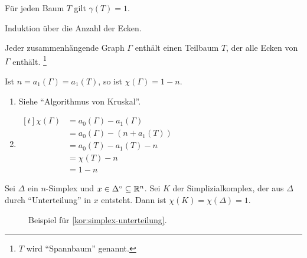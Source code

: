 \begin{bemerkung}
    Für jeden Baum $T$ gilt $\gamma(T) = 1$.
\end{bemerkung}

\begin{beweis}
    Induktion über die Anzahl der Ecken.
\end{beweis}

\begin{bemerkung}
    \begin{bemenum}
        \item Jeder zusammenhängende Graph $\Gamma$ enthält einen
              Teilbaum $T$, der alle Ecken von $\Gamma$ enthält.%
              \footnote{$T$ wird \enquote{Spannbaum} genannt.}
        \item Ist $n = a_1(\Gamma) = a_1(T)$, so ist $\chi(\Gamma) = 1 - n$.
    \end{bemenum}
\end{bemerkung}

\begin{beweis}\leavevmode
    \begin{enumerate}[label=\alph*),ref=\thedefinition.\alph*]
        \item Siehe \enquote{Algorithmus von Kruskal}.
        \item $\begin{aligned}[t]\chi(\Gamma) &= a_0(\Gamma) - a_1(\Gamma)\\
                                        &= a_0(\Gamma) - (n+a_1(T))\\
                                        &= a_0(T) - a_1(T) - n\\
                                        &= \chi(T) - n\\
                                        &= 1-n
              \end{aligned}$
    \end{enumerate}
\end{beweis}

\begin{bemerkung}\label{kor:simplex-unterteilung}
    Sei $\Delta$ ein $n$-Simplex und $x \in \Delta^\circ \subseteq \mathbb{R}^n$.
    Sei $K$ der Simplizialkomplex, der aus $\Delta$ durch 
    \enquote{Unterteilung} in $x$ entsteht. Dann ist $\chi(K) = \chi(\Delta) = 1$.
\end{bemerkung}

\begin{figure}[ht]
    \centering
    \subfloat[$K$]{
        \parbox{4cm}{\centering}
        \label{fig:topology-simplizial-complex-k}
    }%
    \label{fig:simplex-unterteilung-beispiel}
    \caption{Beispiel für \cref{kor:simplex-unterteilung}.}
\end{figure}

